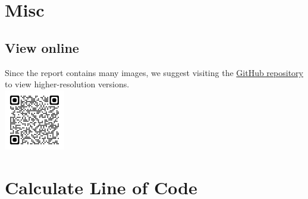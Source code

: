 \documentclass[12pt]{article}
\begin{document}
    \section{Misc}

    \subsection{View online}
    Since the report contains many images, we suggest visiting the \href{https://github.com/CSIEHaTerX/Dr.UML/}{GitHub repository} to view higher-resolution versions.\\
    \includegraphics[]{assets/repoQRCode.png}


    \section{Calculate Line of Code}
\end{document}
